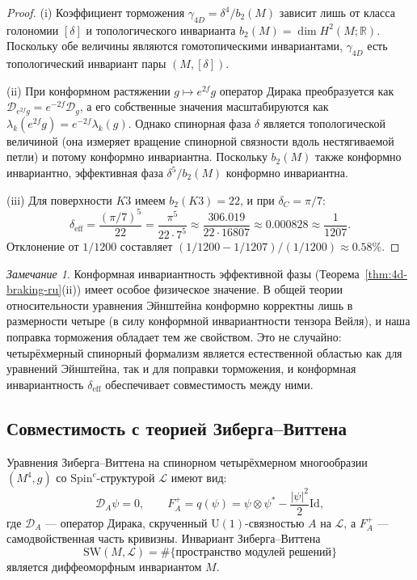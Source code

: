 \documentclass[12pt,a4paper]{article}
\theoremstyle{definition}
\theoremstyle{remark}
\newtheorem{remark}[theorem]{Замечание}
\newcommand{\RR}{\mathbb{R}}
\newcommand{\cD}{\mathcal{D}}
\newcommand{\cL}{\mathcal{L}}
\newcommand{\U}{\mathrm{U}}
\newcommand{\Spinc}{\mathrm{Spin}^c}
\begin{document}
\begin{proof}
(i) Коэффициент торможения $\gamma_{4D} = \delta^4/b_2(M)$ зависит лишь от класса голономии $[\delta]$ и топологического инварианта $b_2(M) = \dim H^2(M; \RR)$. Поскольку обе величины являются гомотопическими инвариантами, $\gamma_{4D}$ есть топологический инвариант пары $(M, [\delta])$.

(ii) При конформном растяжении $g \mapsto e^{2f} g$ оператор Дирака преобразуется как $\cD_{e^{2f}g} = e^{-2f} \cD_g$, а его собственные значения масштабируются как $\lambda_k(e^{2f}g) = e^{-2f} \lambda_k(g)$. Однако спинорная фаза $\delta$ является топологической величиной (она измеряет вращение спинорной связности вдоль нестягиваемой петли) и потому конформно инвариантна. Поскольку $b_2(M)$ также конформно инвариантно, эффективная фаза $\delta^5/b_2(M)$ конформно инвариантна.

(iii) Для поверхности $K3$ имеем $b_2(K3) = 22$, и при $\delta_C = \pi/7$:
\begin{equation}
\delta_{\mathrm{eff}} = \frac{(\pi/7)^5}{22} = \frac{\pi^5}{22 \cdot 7^5} \approx \frac{306.019}{22 \cdot 16807} \approx 0.000828 \approx \frac{1}{1207}.
\end{equation}
Отклонение от $1/1200$ составляет $(1/1200 - 1/1207)/(1/1200) \approx 0.58\%$.
\end{proof}

\begin{remark}
Конформная инвариантность эффективной фазы (Теорема~\ref{thm:4d-braking-ru}(ii)) имеет особое физическое значение. В общей теории относительности уравнения Эйнштейна конформно корректны лишь в размерности четыре (в силу конформной инвариантности тензора Вейля), и наша поправка торможения обладает тем же свойством. Это не случайно: четырёхмерный спинорный формализм является естественной областью как для уравнений Эйнштейна, так и для поправки торможения, и конформная инвариантность $\delta_{\mathrm{eff}}$ обеспечивает совместимость между ними.
\end{remark}

\subsection{Совместимость с теорией Зиберга--Виттена}

Уравнения Зиберга--Виттена на спинорном четырёхмерном многообразии $(M^4, g)$ со $\Spinc$-структурой $\cL$ имеют вид:
\begin{equation}
\cD_A \psi = 0, \qquad F_A^+ = q(\psi) = \psi \otimes \psi^* - \frac{|\psi|^2}{2} \mathrm{Id},
\end{equation}
где $\cD_A$ --- оператор Дирака, скрученный $\U(1)$-связностью $A$ на $\cL$, а $F_A^+$ --- самодвойственная часть кривизны. Инвариант Зиберга--Виттена
\begin{equation}
\mathrm{SW}(M, \cL) = \# \{ \text{пространство модулей решений} \}
\end{equation}
является диффеоморфным инвариантом $M$.
\end{document}

